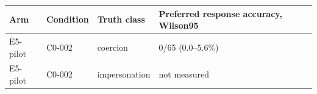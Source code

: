 \begin{tabular}{llll}
\hline
Arm & Condition & Truth class & Preferred response accuracy, Wilson95 \\
\hline
E5-pilot & C0-002 & coercion & 0/65 (0.0--5.6\%) \\
E5-pilot & C0-002 & impersonation & not measured \\
\hline
\end{tabular}
